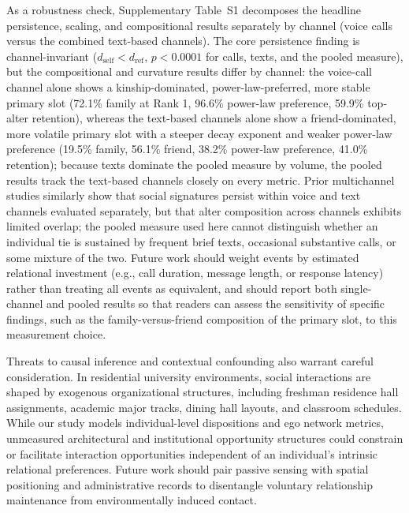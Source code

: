 \documentclass[11pt,letterpaper]{article}
\newcommand{\dself}{d_{\mathrm{self}}}
\newcommand{\dref}{d_{\mathrm{ref}}}
\begin{document}
As a robustness check, Supplementary Table~S1 decomposes the headline persistence, scaling, and compositional results separately by channel (voice calls versus the combined text-based channels). The core persistence finding is channel-invariant ($\dself < \dref$, $p < 0.0001$ for calls, texts, and the pooled measure), but the compositional and curvature results differ by channel: the voice-call channel alone shows a kinship-dominated, power-law-preferred, more stable primary slot (72.1\% family at Rank 1, 96.6\% power-law preference, 59.9\% top-alter retention), whereas the text-based channels alone show a friend-dominated, more volatile primary slot with a steeper decay exponent and weaker power-law preference (19.5\% family, 56.1\% friend, 38.2\% power-law preference, 41.0\% retention); because texts dominate the pooled measure by volume, the pooled results track the text-based channels closely on every metric. Prior multichannel studies similarly show that social signatures persist within voice and text channels evaluated separately, but that alter composition across channels exhibits limited overlap; the pooled measure used here cannot distinguish whether an individual tie is sustained by frequent brief texts, occasional substantive calls, or some mixture of the two. Future work should weight events by estimated relational investment (e.g., call duration, message length, or response latency) rather than treating all events as equivalent, and should report both single-channel and pooled results so that readers can assess the sensitivity of specific findings, such as the family-versus-friend composition of the primary slot, to this measurement choice.

Threats to causal inference and contextual confounding also warrant careful consideration. In residential university environments, social interactions are shaped by exogenous organizational structures, including freshman residence hall assignments, academic major tracks, dining hall layouts, and classroom schedules. While our study models individual-level dispositions and ego network metrics, unmeasured architectural and institutional opportunity structures could constrain or facilitate interaction opportunities independent of an individual's intrinsic relational preferences. Future work should pair passive sensing with spatial positioning and administrative records to disentangle voluntary relationship maintenance from environmentally induced contact.
\end{document}
